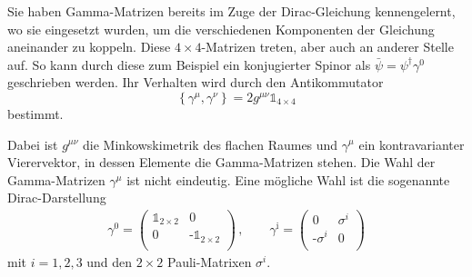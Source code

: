 \documentclass{exercise}
\begin{document}

Sie haben Gamma-Matrizen bereits im Zuge der Dirac-Gleichung kennengelernt, wo sie eingesetzt wurden, um die verschiedenen Komponenten der Gleichung aneinander zu koppeln.
Diese $4 \times 4$-Matrizen treten, aber auch an anderer Stelle auf. 
So kann durch diese zum Beispiel ein konjugierter Spinor als $\bar{\psi} = \psi^\dagger \gamma^0$ geschrieben werden.
Ihr Verhalten wird durch den Antikommutator
\begin{equation}
    \label{eq:AntiKom}
    \left\{\gamma^\mu, \gamma^\nu \right\} = 2 g^{\mu \nu} \mathbb{1}_{4 \times 4}
\end{equation}
bestimmt.

Dabei ist $g^{\mu \nu}$ die Minkowskimetrik des flachen Raumes und $\gamma^\mu $ ein kontravarianter Vierervektor, in dessen Elemente die Gamma-Matrizen stehen.
Die Wahl der Gamma-Matrizen $\gamma^\mu$ ist nicht eindeutig.
Eine mögliche Wahl ist die sogenannte Dirac-Darstellung
\begin{align}
    \label{Gamma}
    \gamma^0 =   \begin{pmatrix}
                \mathbb{1}_{2 \times 2} & 0 \\
                0 & \text{-}\mathbb{1}_{2 \times 2} \\
    \end{pmatrix}\,, \qquad
    \gamma^\text{i} =   \begin{pmatrix}
        0 & \sigma^i \\
       \text{-} \sigma^i & 0 \\
    \end{pmatrix}
\end{align} 
mit $i = 1, 2, 3$ und den $2\times2$ Pauli-Matrixen $\sigma^i$.
\end{document}
